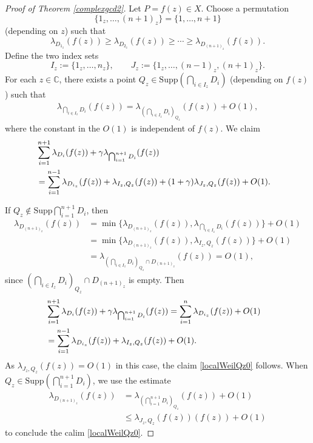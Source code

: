 \documentclass[10pt,a4paper]{amsart}
\begin{document}
\begin{proof}[Proof of Theorem \ref{complexgcd2}]
Let $P=f(z)\in X$.  Choose a permutation
\[
\{1_z,\ldots,(n+1)_z\}=\{1,\ldots,n+1\}
\]
(depending on $z$) such that
\[
\lambda_{D_{1_z}}(f(z)) \ge \lambda_{D_{2_z}}(f(z)) \ge \cdots \ge \lambda_{D_{(n+1)_z}}(f(z)).
\]
Define the two index sets
\[
I_z:=\{1_z,\ldots,n_z\},\qquad 
J_z:=\{1_z,\ldots,(n-1)_z,(n+1)_z\}.
\]
For each $z\in \mathbb C$, there exists a point $Q_z\in \text{Supp} (\bigcap_{i \in I_z} D_{i})$ (depending on $f(z)$) such that
\begin{align*}
\lambda_{\bigcap_{i \in I_z} D_{i}}(f(z))=\lambda_{ (\bigcap_{i \in I_z} D_{i})_{Q_z}}(f(z))+O(1),
\end{align*}
where the constant in the $O(1)$ is independent of $f(z)$.
We claim 
\begin{align}\label{localWeilQz0}
 &\sum_{i=1}^{n+1}\lambda_{ D_{i}}(f(z))+ \gamma \lambda_{\bigcap_{i=1}^{n+1}D_{i}} (f(z)) \cr
& = \sum_{i=1}^{n-1}\lambda_{D_{i_z}}(f(z))  +\lambda_{   I_z,Q_z }(f(z))+  (1+\gamma) \lambda_{ J_z,Q_z }(f(z))+O(1). 
\end{align}
 

If $Q_z\not\in \text{Supp} \bigcap_{i=1}^{n+1}D_{i}$, then
\begin{align*}
\lambda_{ D_{(n+1)_z}   }(f(z))&=\min \{\lambda_{D_{(n+1)_z} }(f(z)),\lambda_{\bigcap_{i  \in I_z} D_i}(f(z))\}+O(1)\\
&=\min \{\lambda_{D_{(n+1)_z} }(f(z)),\lambda_{   I_z,Q_z }(f(z))\}+O(1)\\
&=\lambda_{(\bigcap_{i \in I_z} D_{i})_{Q_z}\cap D_{(n+1)_z}}(f(z))=O(1),  
\end{align*}
since $({\bigcap_{i \in I_z} D_{i}})_{Q_z}\cap D_{(n+1)_z}$ is empty.  
Then
\begin{align*}
  &\sum_{i=1}^{n+1}\lambda_{ D_{i}}(f(z)) + \gamma \lambda_{\bigcap_{i=1}^{n+1}D_{i}} (f(z)) 
 = \sum_{i=1}^{n}\lambda_{ D_{i_z}}(f(z)) +O(1)\cr
&= \sum_{i=1}^{n-1}\lambda_{D_{i_z}}(f(z))  +\lambda_{   I_z,Q_z }(f(z))+O(1).
\end{align*}
As $\lambda_{J_z,Q_z }(f(z))=O(1)$ in this case, the claim \eqref{localWeilQz0} follows.
When $Q_z\in \text{Supp} (\bigcap_{i=1}^{n+1} D_{i})$, %
we use the estimate
\begin{align*}
\lambda_{ D_{(n+1)_z} } (f(z)) &=\lambda_{(\bigcap_{i=1}^{n+1} D_{i})_{Q_z}} (f(z)) +O(1)\\
&\leq \lambda_{ J_z,Q_z }(f(z)) (f(z) )+O(1) 
\end{align*}
to conclude the calim  \eqref{localWeilQz0}.


\end{proof}
\end{document}
